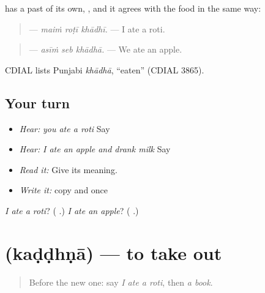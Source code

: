 \begin{grammarlens}[title={Grammar Lens: a past of its own}]
\textbf{} has a past of its own, \textbf{}, and it agrees with the food in the same way:

\begin{quote}
\textbf{  } — \emph{maiṁ roṭī khādhī.} — I ate a roti.
\end{quote}

\begin{quote}
\textbf{  } — \emph{asīṁ seb khādhā.} — We ate an apple.
\end{quote}

CDIAL lists Punjabi \emph{khādhā}, \textquotedblleft{}eaten\textquotedblright{} (CDIAL 3865).
\end{grammarlens}

\subsection*{Your turn}
\begin{itemize}
\raggedright
  \item \emph{Hear:} \emph{you ate a roti} Say \textbf{  }
  \item \emph{Hear:} \emph{I ate an apple and drank milk} Say \textbf{     }
  \item \emph{Read it:} \textbf{  } Give its meaning.
  \item \emph{Write it:} copy \textbf{} and \textbf{} once
\end{itemize}

\begin{tcolorbox}[breakable,colback=teal!4,colframe=teal!35!black,title={Before you move on}]
\emph{I ate a roti}? (\textbf{  }.) \emph{I ate an apple}? (\textbf{  }.)
\end{tcolorbox}
\section[\texorpdfstring{\pa{ਕੱਢਣਾ} (kaḍḍhṇā)}{ਕੱਢਣਾ (kaḍḍhṇā)}]{ (kaḍḍhṇā) — to take out}

\label{lesson:PA-C219-kaddhna}



\begin{quote}
Before the new one: say \emph{I ate a roti}, then \emph{a book}.
\end{quote}

